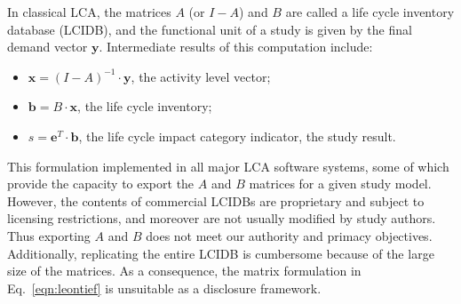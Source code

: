 In classical LCA, the matrices $A$ (or $I-A$) and $B$ are called a life cycle inventory database (LCIDB), and the functional unit of a study is given by the final demand vector $\mathbf{y}$.  Intermediate results of this computation include:
\begin{itemize}
\item $\mathbf{x} = \left(I-A\right)^{-1}\cdot\mathbf{y}$, the activity level vector;
\item $\mathbf{b} = B\cdot\mathbf{x}$, the life cycle inventory;
\item $s = \mathbf{e}^T\cdot\mathbf{b}$, the life cycle impact category indicator, the study result.
\end{itemize}

This formulation implemented in all major LCA software systems, some of which provide the capacity to export the $A$ and $B$ matrices for a given study model.  However, the contents of commercial LCIDBs are proprietary and subject to licensing restrictions, and moreover are not usually modified by study authors.  Thus exporting $A$ and $B$ does not meet our authority and primacy objectives.  Additionally, replicating the entire LCIDB is cumbersome because of the large size of the matrices.   As a consequence, the matrix formulation in Eq.~\ref{eqn:leontief} is unsuitable as a disclosure framework.
